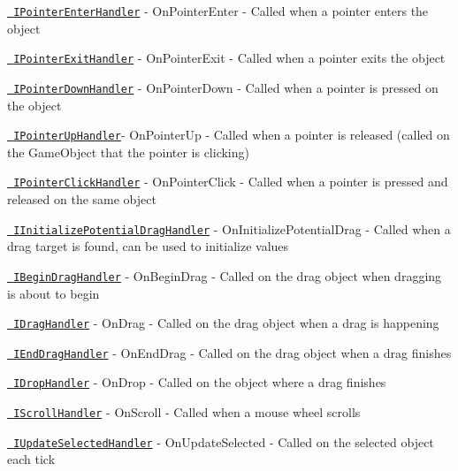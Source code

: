 \begin{DoxyItemize}
\item \href{xref:UnityEngine.EventSystems.IPointerEnterHandler}{\texttt{ IPointer\+Enter\+Handler}} -\/ On\+Pointer\+Enter -\/ Called when a pointer enters the object
\item \href{xref:UnityEngine.EventSystems.IPointerExitHandler}{\texttt{ IPointer\+Exit\+Handler}} -\/ On\+Pointer\+Exit -\/ Called when a pointer exits the object
\item \href{xref:UnityEngine.EventSystems.IPointerDownHandler}{\texttt{ IPointer\+Down\+Handler}} -\/ On\+Pointer\+Down -\/ Called when a pointer is pressed on the object
\item \href{xref:UnityEngine.EventSystems.IPointerUpHandler}{\texttt{ IPointer\+Up\+Handler}}-\/ On\+Pointer\+Up -\/ Called when a pointer is released (called on the Game\+Object that the pointer is clicking)
\item \href{xref:UnityEngine.EventSystems.IPointerClickHandler}{\texttt{ IPointer\+Click\+Handler}} -\/ On\+Pointer\+Click -\/ Called when a pointer is pressed and released on the same object
\item \href{xref:UnityEngine.EventSystems.IInitializePotentialDragHandler}{\texttt{ IInitialize\+Potential\+Drag\+Handler}} -\/ On\+Initialize\+Potential\+Drag -\/ Called when a drag target is found, can be used to initialize values
\item \href{xref:UnityEngine.EventSystems.IBeginDragHandler}{\texttt{ IBegin\+Drag\+Handler}} -\/ On\+Begin\+Drag -\/ Called on the drag object when dragging is about to begin
\item \href{xref:UnityEngine.EventSystems.IDragHandler}{\texttt{ IDrag\+Handler}} -\/ On\+Drag -\/ Called on the drag object when a drag is happening
\item \href{xref:UnityEngine.EventSystems.IEndDragHandler}{\texttt{ IEnd\+Drag\+Handler}} -\/ On\+End\+Drag -\/ Called on the drag object when a drag finishes
\item \href{xref:UnityEngine.EventSystems.IDropHandler}{\texttt{ IDrop\+Handler}} -\/ On\+Drop -\/ Called on the object where a drag finishes
\item \href{xref:UnityEngine.EventSystems.IScrollHandler}{\texttt{ IScroll\+Handler}} -\/ On\+Scroll -\/ Called when a mouse wheel scrolls
\item \href{xref:UnityEngine.EventSystems.IUpdateSelectedHandler}{\texttt{ IUpdate\+Selected\+Handler}} -\/ On\+Update\+Selected -\/ Called on the selected object each tick

\end{DoxyItemize}

